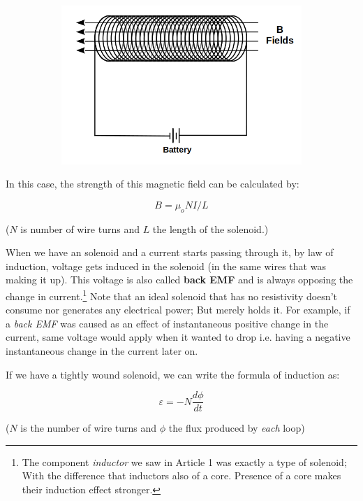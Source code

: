 \documentclass{article}
\begin{document}
	\begin{figure}[h!]
	\centering
	\begin{subfigure}[b]{0.7\linewidth}
	\includegraphics[width=\linewidth]{solenoid.png}
	\end{subfigure}
	\end{figure}
	
	In this case, the strength of this magnetic field can be calculated by:
	
	$$ B = \mu_o N I / L$$
	
	($N$ is number of wire turns and $L$ the length of the solenoid.)
		
	When we have an solenoid and a current starts passing through it, by law of induction, voltage gets induced in the solenoid (in the same wires that was making it up).
	This voltage is also called \textbf{back EMF} and is always opposing the change in current.\footnote[1]{The component \textit{inductor} we saw in Article 1 was exactly a type of solenoid; With the difference that inductors also of a core. Presence of a core makes their induction effect stronger.}
	Note that an ideal solenoid that has no resistivity doesn't consume nor generates any electrical power; But merely holds it.
	For example, if a \textit{back EMF} was caused as an effect of instantaneous positive change in the current, same voltage would apply when it wanted to drop i.e. having a negative instantaneous change in the current later on.
	
	If we have a tightly wound solenoid, we can write the formula of induction as:
	
	$$ \varepsilon = -N\frac{d\phi}{dt} $$
	
	($N$ is the number of wire turns and $\phi$ the flux produced by \textit{each} loop)
	
\end{document}
